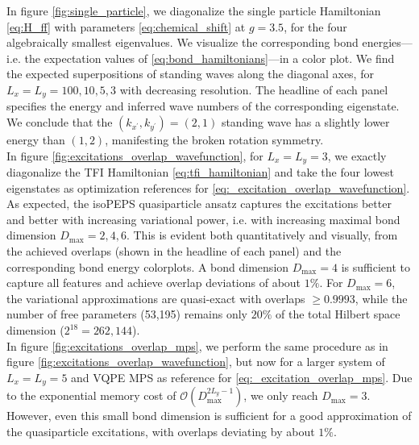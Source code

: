 \noindent In figure \ref{fig:single_particle}, we diagonalize the single particle Hamiltonian \eqref{eq:H_ff} with parameters \eqref{eq:chemical_shift} at $g = 3.5$, for the four algebraically smallest eigenvalues. We visualize the corresponding bond energies---i.e. the expectation values of \eqref{eq:bond_hamiltonians}---in a color plot. We find the expected superpositions of standing waves along the diagonal axes, for $L_x = L_y = 100, 10, 5, 3$ with decreasing resolution. The headline of each panel specifies the energy and inferred wave numbers of the corresponding eigenstate. We conclude that the $(k_{x^{\prime}}, k_{y^{\prime}}) = (2, 1)$ standing wave has a slightly lower energy than $(1, 2)$, manifesting the broken rotation symmetry. \\[0.5em]

\noindent In figure \ref{fig:excitations_overlap_wavefunction}, for $L_x = L_y = 3$, we exactly diagonalize the TFI Hamiltonian \eqref{eq:tfi_hamiltonian} and take the four lowest eigenstates as optimization references for \eqref{eq:_excitation_overlap_wavefunction}. As expected, the isoPEPS quasiparticle ansatz captures the excitations better and better with increasing variational power, i.e. with increasing maximal bond dimension $D_{\text{max}} = 2, 4, 6$. This is evident both quantitatively and visually, from the achieved overlaps (shown in the headline of each panel) and the corresponding bond energy colorplots. A bond dimension $D_{\text{max}} = 4$ is sufficient to capture all features and achieve overlap deviations of about $1\%$. For $D_{\text{max}} = 6$, the variational approximations are quasi-exact with overlaps $\ge 0.9993$, while the number of free parameters (53,195) remains only $20\%$ of the total Hilbert space dimension ($2^{18} = 262,144$). \\[0.5em]
	
\noindent In figure \ref{fig:excitations_overlap_mps}, we perform the same procedure as in figure \ref{fig:excitations_overlap_wavefunction}, but now for a larger system of $L_x = L_y = 5$ and VQPE MPS as reference for \eqref{eq:_excitation_overlap_mps}. Due to the exponential memory cost of $\mathcal{O}(D_{\text{max}}^{2 L_y - 1})$, we only reach $D_{\text{max}} = 3$. However, even this small bond dimension is sufficient for a good approximation of the quasiparticle excitations, with overlaps deviating by about $1\%$.\\[0.5em]
	
